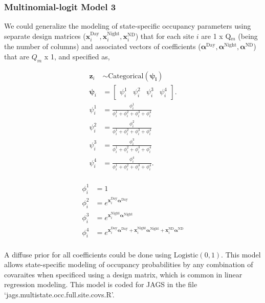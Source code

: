\documentclass[12pt]{article}
\begin{document}
\subsubsection{Multinomial-logit Model 3}
We could generalize the modeling of state-specific occupancy parameters using separate design matrices ($\textbf{x}_{i}^{\text{Day}}, \textbf{x}_{i}^{\text{Night}}, \textbf{x}_{i}^{\text{ND}}$) that for each site $i$ are  1 x Q$_{m}$ (being the number of columns) and associated vectors of coefficients ($\boldsymbol{\alpha}^{\text{Day}}, \boldsymbol{\alpha}^{\text{Night}}, \boldsymbol{\alpha}^{\text{ND}}$) that are $Q_{m}$ x 1, and specified as,
\begin{center}
\begin{align*}
\textbf{z}_{i} &\sim \text{Categorical}(\boldsymbol{\psi_{i}})\\
\boldsymbol{\psi}_{i} &= \begin{bmatrix} \psi^1_{i} & \psi^2_{i} & \psi^3_{i} & \psi^4_{i} \end{bmatrix}.\\
\psi^1_{i} &=\frac{\phi^1_{i}}{\phi^1_{i}+ \phi^2_{i}+\phi^3_{i}+\phi^4_{i}}\\
\psi^2_{i} &=\frac{\phi^2_{i}}{\phi^1_{i}+ \phi^2_{i}+\phi^3_{i}+\phi^4_{i}}\\
\psi^3_{i} &=\frac{\phi^3_{i}}{\phi^1_{i}+ \phi^2_{i}+\phi^3_{i}+\phi^4_{i}}\\
\psi^4_{i} &=\frac{\phi^4_{i}}{\phi^1_{i}+ \phi^2_{i}+\phi^3_{i}+\phi^4_{i}}.\\
\end{align*}
\end{center}

\begin{center}
\begin{align*}
\phi^1_{i} &= 1\\
\phi^2_{i} &= e^{\textbf{x}_{i}^{\text{Day}}\boldsymbol{\alpha}^{\text{Day}}}\\
\phi^3_{i} &= e^{\textbf{x}_{i}^{\text{Night}}\boldsymbol{\alpha}^{\text{Night}}}\\
\phi^4_{i} &= e^{\textbf{x}_{i}^{\text{Day}}\boldsymbol{\alpha}^{\text{Day}}+\textbf{x}_{i}^{\text{Night}}\boldsymbol{\alpha}^{\text{Night}}+\textbf{x}_{i}^{\text{ND}}\boldsymbol{\alpha}^{\text{ND}}}\\
\end{align*}
\end{center}

A diffuse prior for all coefficients could be done using $\text{Logistic}(0,1).$ This model allows state-specific modeling of occupancy probabilities by any combination of covaraites when specificed using a design matrix, which is common in linear regression modeling. This model is coded for JAGS in the file `jags.multistate.occ.full.site.covs.R'.
\end{document}

